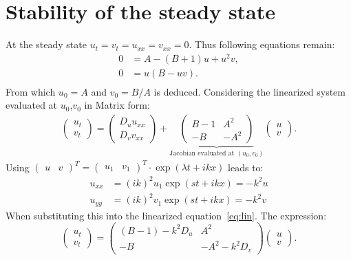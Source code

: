 \section{Stability of the steady state}
At the steady state $u_t = v_t = u_{xx} = v_{xx} = 0$. Thus following equations remain:
\begin{align}
0 &= A - (B + 1)u + u^2v, \\
0 &= u(B - uv). \\
\end{align}
From which $u_0 = A$ and $v_0 = B/A$ is deduced. Considering the linearized system evaluated at $u_0$,$v_0$ in Matrix form:
\begin{align}
\begin{pmatrix}
u_t \\ v_t
\end{pmatrix} =
\begin{pmatrix}
D_u u_{xx} \\ D_v v_{xx}
\end{pmatrix} +
\underbrace{\begin{pmatrix}
B-1 & A^2 \\
-B & -A^2
\end{pmatrix}}_\text{Jacobian evaluated at $(u_0,v_0)$}
\begin{pmatrix}
u \\ v
\end{pmatrix}. 
\label{eq:lin} 
\end{align}
Using $\begin{pmatrix} u & v \end{pmatrix}^T = \begin{pmatrix} u_1 & v_1 \end{pmatrix}^T \cdot \exp(\lambda t + ikx)$ leads to:
\begin{align}
u_{xx} &= (ik)^2 u_1 \exp(s t + ikx) = -k^2u \\
u_{yy} &= (ik)^2 v_1 \exp(s t + ikx) = -k^2v
\end{align}
When substituting this into the linearized equation~\ref{eq:lin}. The expression:
\begin{equation}
\begin{pmatrix}
u_t \\ v_t
\end{pmatrix} =
\begin{pmatrix}
(B - 1)-k^2 D_u & A^2 \\
-B & -A^2-k^2 D_v
\end{pmatrix}
\begin{pmatrix}
u \\ v
\end{pmatrix}.
\end{equation}

